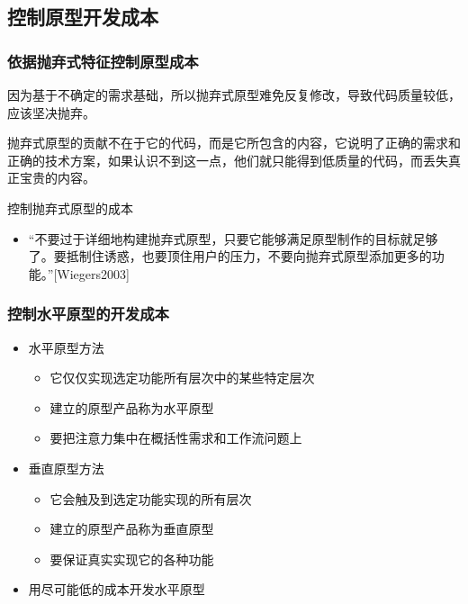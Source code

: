 \subsection{控制原型开发成本}

\subsubsection{依据抛弃式特征控制原型成本}
因为基于不确定的需求基础，所以抛弃式原型难免反复修改，导致代码质量较低，应该坚决抛弃。

抛弃式原型的贡献不在于它的代码，而是它所包含的内容，它说明了正确的需求和正确的技术方案，如果认识不到这一点，他们就只能得到低质量的代码，而丢失真正宝贵的内容。

控制抛弃式原型的成本
\begin{itemize}
    \item “不要过于详细地构建抛弃式原型，只要它能够满足原型制作的目标就足够了。要抵制住诱惑，也要顶住用户的压力，不要向抛弃式原型添加更多的功能。”[Wiegers2003]
\end{itemize}

\subsubsection{控制水平原型的开发成本}
\vspace{-0.8em}
\begin{multicols}{2}
    \begin{itemize}
        \item 水平原型方法
        \begin{itemize}
            \item 它仅仅实现选定功能所有层次中的某些特定层次 
            \item 建立的原型产品称为水平原型
            \item 要把注意力集中在概括性需求和工作流问题上 
        \end{itemize}
        \item 垂直原型方法
        \begin{itemize}
            \item 它会触及到选定功能实现的所有层次
            \item 建立的原型产品称为垂直原型
            \item 要保证真实实现它的各种功能
        \end{itemize}
        \item 用尽可能低的成本开发水平原型
    \end{itemize}
\end{multicols}
\vspace{-1em}

